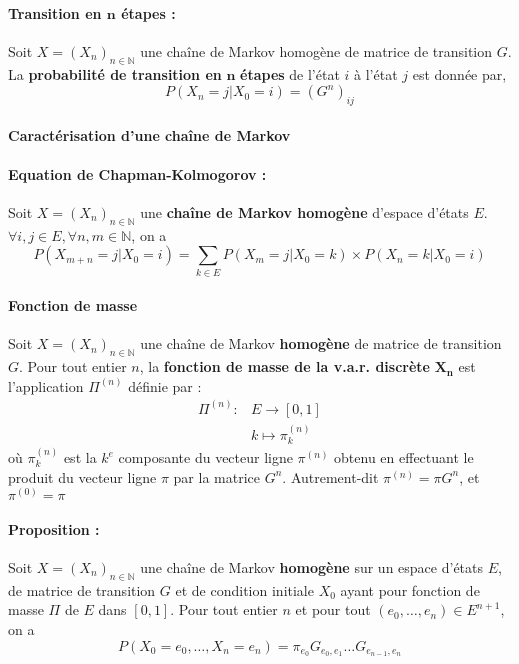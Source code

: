 \documentclass[10pt,a4paper,twoside]{article}
\begin{document}
\paragraph{Transition en $\mathbf{n}$ étapes :} Soit $X=(X_{n})_{n\in \mathbb{N}}$ une chaîne de Markov homogène de matrice de transition $G$. La \textbf{probabilité de transition en} $\mathbf{n}$ \textbf{étapes} de l'état $i$ à l'état $j$ est donnée par,
\[  P(X_{n}=j|X_{0}=i) = (G^{n})_{ij} \]

\paragraph{Caractérisation d'une chaîne de Markov}
\paragraph{Equation de Chapman-Kolmogorov :}  Soit $X=(X_{n})_{n\in \mathbb{N}}$ une \textbf{chaîne de Markov homogène} d'espace d'états $E$. $\forall i,j \in E, \forall n,m\in\mathbb{N}$, on a 
\[  P(X_{m+n}=j|X_{0}=i)=\sum_{k\in E}P(X_{m}=j|X_{0}=k)\times P(X_{n}=k|X_{0}=i) \]

\paragraph{Fonction de masse} Soit $X=(X_{n})_{n\in\mathbb{N}}$ une chaîne de Markov \textbf{homogène} de matrice de transition $G$. Pour tout entier $n$, la \textbf{fonction de masse de la v.a.r. discrète} $\mathbf{X_{n}}$ est l'application $\Pi^{(n)}$ définie par :
\begin{align*}
\Pi^{(n)} : & E \longrightarrow [0,1]\\
            & k \longmapsto \pi^{(n)}_{k}
\end{align*}
où $\pi^{(n)}_{k}$ est la $k^{e}$ composante du vecteur ligne $\pi^{(n)}$ obtenu en effectuant le produit du vecteur ligne $\pi$ par la matrice $G^{n}$. Autrement-dit $\pi^{(n)}=\pi G^{n}$, et $\pi^{(0)} = \pi$

\paragraph{Proposition :} Soit $X=(X_{n})_{n\in\mathbb{N}}$ une chaîne de Markov \textbf{homogène} sur un espace d'états $E$, de matrice de transition $G$ et de condition initiale $X_{0}$ ayant pour fonction de masse $\Pi$ de $E$ dans $[0,1]$. Pour tout entier $n$ et pour tout $(e_{0},\ldots,e_{n})\in E^{n+1}$, on a 
\[ P(X_{0}=e_{0},\ldots,X_{n}=e_{n}) = \pi_{e_{0}}G_{e_{0},e_{1}}\ldots G_{e_{n-1},e_{n}} \]
\end{document}
